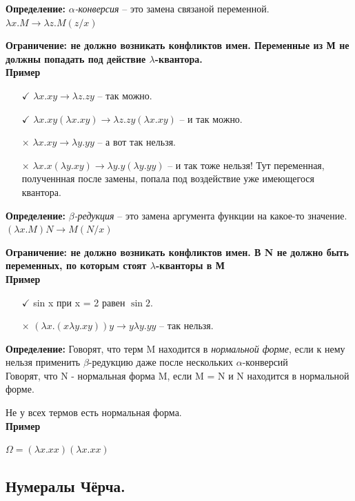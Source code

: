 \textbf{Определение: } \textit{$\alpha$-конверсия} -- это замена связаной переменной. $\lambda x.M \rightarrow \lambda z.M(z/x)$

\textbf{Ограничение: не должно возникать конфликтов имен. Переменные из М не должны попадать под действие $\lambda$-квантора.}\\

\textbf{Пример}
\begin{itemize}
    \item [$\checkmark$] $\lambda x.xy \rightarrow \lambda z.zy$ -- так можно.
    \item [$\checkmark$] $\lambda x.xy(\lambda x.xy) \rightarrow \lambda z.zy(\lambda x.xy)$ -- и так можно.
    \item[$\times$] $\lambda x.xy \rightarrow \lambda y.yy$ -- а вот так нельзя.
    \item[$\times$] $\lambda x.x(\lambda y.xy) \rightarrow \lambda y.y(\lambda y.yy)$ -- и так тоже нельзя! Тут переменная, полученнная после замены, попала под воздействие уже имеющегося квантора.
\end{itemize}

\textbf{Определение: } \textit{$\beta$-редукция} -- это замена аргумента функции на какое-то значение. $(\lambda x.M)N \rightarrow M(N/x)$

\textbf{Ограничение: не должно возникать конфликтов имен. В N не должно быть переменных, по которым стоят $\lambda$-кванторы в М}\\

\textbf{Пример}
\begin{itemize}
    \item[$\checkmark$] sin x при x = 2 равен $\sin 2$.
    \item[$\times $] $(\lambda x.(x \lambda y.xy))y \rightarrow y\lambda y.yy$ -- так нельзя.
\end{itemize}

\textbf{Определение: } Говорят, что терм M находится в \textit{нормальной форме}, если к нему нельзя применить $\beta$-редукцию даже после нескольких $\alpha$-конверсий\\ Говорят, что N - нормальная форма M, если M = N и N находится в нормальной форме.

Не у всех термов есть нормальная форма.\\

\textbf{Пример}

$\Omega = (\lambda x.xx)(\lambda x.xx)$

\subsection{Нумералы Чёрча.}

